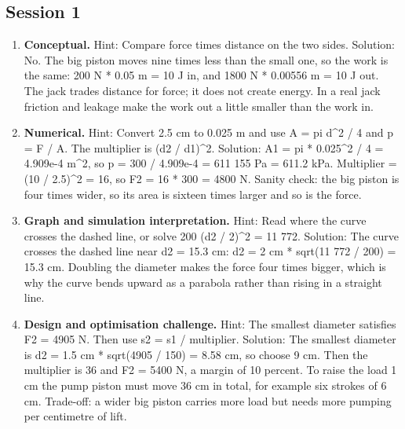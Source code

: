 \documentclass[11pt,a4paper]{article}
\begin{document}
\subsection*{Session 1}
\begin{enumerate}[nosep]
\item \textbf{Conceptual.} Hint: Compare force times distance on the two sides. Solution: No. The big piston moves nine times less than the small one, so the work is the same: 200 N * 0.05 m = 10 J in, and 1800 N * 0.00556 m = 10 J out. The jack trades distance for force; it does not create energy. In a real jack friction and leakage make the work out a little smaller than the work in.
\item \textbf{Numerical.} Hint: Convert 2.5 cm to 0.025 m and use A = pi d\textasciicircum{}2 / 4 and p = F / A. The multiplier is (d2 / d1)\textasciicircum{}2. Solution: A1 = pi * 0.025\textasciicircum{}2 / 4 = 4.909e-4 m\textasciicircum{}2, so p = 300 / 4.909e-4 = 611 155 Pa = 611.2 kPa. Multiplier = (10 / 2.5)\textasciicircum{}2 = 16, so F2 = 16 * 300 = 4800 N. Sanity check: the big piston is four times wider, so its area is sixteen times larger and so is the force.
\item \textbf{Graph and simulation interpretation.} Hint: Read where the curve crosses the dashed line, or solve 200 (d2 / 2)\textasciicircum{}2 = 11 772. Solution: The curve crosses the dashed line near d2 = 15.3 cm: d2 = 2 cm * sqrt(11 772 / 200) = 15.3 cm. Doubling the diameter makes the force four times bigger, which is why the curve bends upward as a parabola rather than rising in a straight line.
\item \textbf{Design and optimisation challenge.} Hint: The smallest diameter satisfies F2 = 4905 N. Then use s2 = s1 / multiplier. Solution: The smallest diameter is d2 = 1.5 cm * sqrt(4905 / 150) = 8.58 cm, so choose 9 cm. Then the multiplier is 36 and F2 = 5400 N, a margin of 10 percent. To raise the load 1 cm the pump piston must move 36 cm in total, for example six strokes of 6 cm. Trade-off: a wider big piston carries more load but needs more pumping per centimetre of lift.
\end{enumerate}
\end{document}
